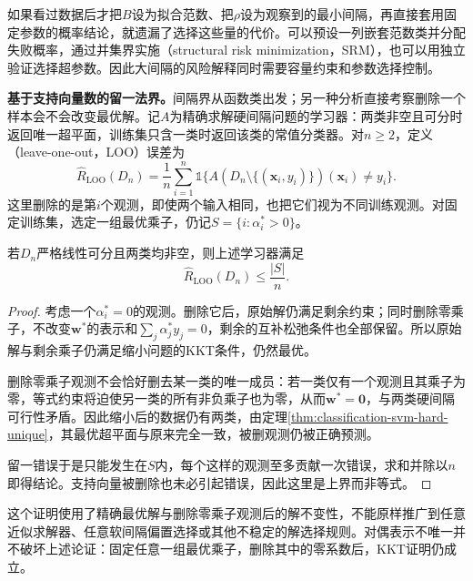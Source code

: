 如果看过数据后才把$B$设为拟合范数、把$\rho$设为观察到的最小间隔，再直接套用固定参数的概率结论，就遗漏了选择这些量的代价。可以预设一列嵌套范数类并分配失败概率，通过并集界实施（structural risk minimization，SRM），也可以用独立验证选择超参数。因此大间隔的风险解释同时需要容量约束和参数选择控制。

\label{sec:classification-svm-loo}

\textbf{基于支持向量数的留一法界。}间隔界从函数类出发；另一种分析直接考察删除一个样本会不会改变最优解。记$A$为精确求解硬间隔问题的学习器：两类非空且可分时返回唯一超平面，训练集只含一类时返回该类的常值分类器。对$n\ge2$，定义（leave-one-out，LOO）误差为
\begin{equation}
  \widehat R_{\mathrm{LOO}}(D_n)
  =\frac1n\sum_{i=1}^n
    \mathbb{1}\bigl\{
       A(D_n\setminus\{(\bm{x}_i,y_i)\})(\bm{x}_i)
       \ne y_i
     \bigr\}.
  \label{eq:classification-svm-loo-definition}
\end{equation}
这里删除的是第$i$个观测，即使两个输入相同，也把它们视为不同训练观测。对固定训练集，选定一组最优乘子，仍记$S=\{i:\alpha_i^{\ast}>0\}$。

\begin{theorem}[硬间隔的支持向量计数界]
  \label{thm:classification-svm-loo-bound}
  若$D_n$严格线性可分且两类均非空，则上述学习器满足
  \[
    \widehat R_{\mathrm{LOO}}(D_n)\le\frac{|S|}{n}.
  \]
\end{theorem}
\begin{proof}
考虑一个$\alpha_i^{\ast}=0$的观测。删除它后，原始解仍满足剩余约束；同时删除零乘子，不改变$\bm{w}^{\ast}$的表示和$\sum_j\alpha_j^{\ast}y_j=0$，剩余的互补松弛条件也全部保留。所以原始解与剩余乘子仍满足缩小问题的KKT条件，仍然最优。

删除零乘子观测不会恰好删去某一类的唯一成员：若一类仅有一个观测且其乘子为零，等式约束将迫使另一类的所有非负乘子也为零，从而$\bm{w}^{\ast}=\bm{0}$，与两类硬间隔可行性矛盾。因此缩小后的数据仍有两类，由定理\ref{thm:classification-svm-hard-unique}，其最优超平面与原来完全一致，被删观测仍被正确预测。

留一错误于是只能发生在$S$内，每个这样的观测至多贡献一次错误，求和并除以$n$即得结论。支持向量被删除也未必引起错误，因此这里是上界而非等式。
\end{proof}

这个证明使用了精确最优解与删除零乘子观测后的解不变性，不能原样推广到任意近似求解器、任意软间隔偏置选择或其他不稳定的解选择规则。对偶表示不唯一并不破坏上述论证：固定任意一组最优乘子，删除其中的零系数后，KKT证明仍成立。

